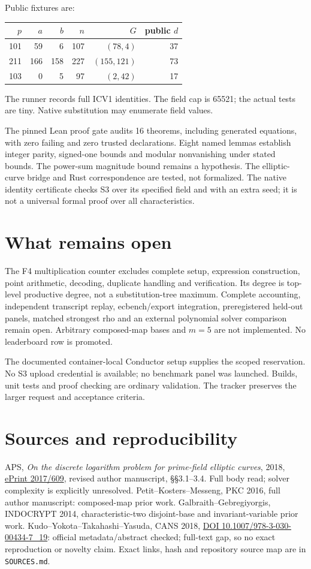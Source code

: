 \documentclass[10pt]{article}
\begin{document}
Public fixtures are:
\begin{center}
\begin{tabular}{rrrrrr}
\toprule
$p$ & $a$ & $b$ & $n$ & $G$ & public $d$\\
\midrule
101 & 59 & 6 & 107 & $(78,4)$ & 37\\
211 & 166 & 158 & 227 & $(155,121)$ & 73\\
103 & 0 & 5 & 97 & $(2,42)$ & 17\\
\bottomrule
\end{tabular}
\end{center}
The runner records full ICV1 identities. The field cap is 65521; the actual
tests are tiny. Native substitution may enumerate field values.

The pinned Lean proof gate audits 16 theorems, including generated equations,
with zero failing and zero trusted declarations. Eight named lemmas establish
integer parity, signed-one bounds and modular nonvanishing under stated
bounds. The power-sum magnitude bound remains a hypothesis. The elliptic-curve
bridge and Rust correspondence are tested, not formalized. The native
identity certificate checks S3 over its specified field and with an extra seed;
it is not a universal formal proof over all characteristics.

\section*{What remains open}
The F4 multiplication counter excludes complete setup, expression construction,
point arithmetic, decoding, duplicate handling and verification. Its degree
is top-level productive degree, not a substitution-tree maximum. Complete
accounting, independent transcript replay, ecbench/export integration,
preregistered held-out panels, matched strongest rho and an external polynomial
solver comparison remain open. Arbitrary composed-map bases and $m=5$ are
not implemented. No leaderboard row is promoted.

The documented container-local Conductor setup supplies the scoped reservation.
No S3 upload credential is available; no benchmark panel was launched.
Builds, unit tests and proof checking are ordinary validation. The tracker
preserves the larger request and acceptance criteria.

\section*{Sources and reproducibility}
APS, \emph{On the discrete logarithm problem for prime-field elliptic curves},
2018, \href{https://eprint.iacr.org/2017/609}{ePrint 2017/609}, revised author
manuscript, \S\S3.1--3.4. Full body read; solver complexity is explicitly unresolved.
Petit--Kosters--Messeng, PKC 2016, full author manuscript: composed-map prior work.
Galbraith--Gebregiyorgis, INDOCRYPT 2014, characteristic-two disjoint-base and
invariant-variable prior work.
Kudo--Yokota--Takahashi--Yasuda, CANS 2018,
\href{https://doi.org/10.1007/978-3-030-00434-7_19}{DOI 10.1007/978-3-030-00434-7\_19}:
official metadata/abstract checked; full-text gap, so no exact reproduction or
novelty claim. Exact links, hash and repository source map are in \texttt{SOURCES.md}.
\end{document}
